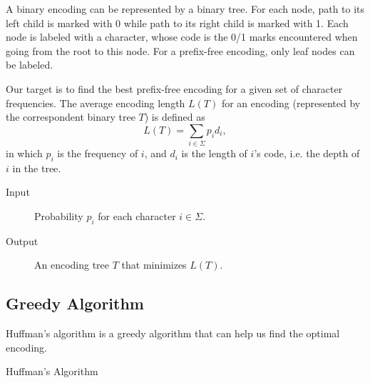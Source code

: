 A binary encoding can be represented by a binary tree. For each node, path to its left child is marked with 0 while path to its right child is marked with 1. Each node is labeled with a character, whose code is the 0/1 marks encountered when going from the root to this node. For a prefix-free encoding, only leaf nodes can be labeled.

Our target is to find the best prefix-free encoding for a given set of character frequencies. The average encoding length $L(T)$ for an encoding (represented by the correspondent binary tree $T$) is defined as
$$L(T)=\sum\limits_{i\in\Sigma}p_id_i,$$
in which $p_i$ is the frequency of $i$, and $d_i$ is the length of $i$'s code, i.e. the depth of $i$ in the tree.
\begin{description}
\item[Input]Probability $p_i$ for each character $i\in\Sigma$.
\item[Output]An encoding tree $T$ that minimizes $L(T).$
\end{description}

\subsection{Greedy Algorithm}
Huffman's algorithm is a greedy algorithm that can help us find the optimal encoding.
\begin{algorithm}[ht]
\caption{Huffman's Algorithm}\label{huffman}
\begin{algorithmic}[1]
\EndIf
{}
\end{algorithmic}
\end{algorithm}

